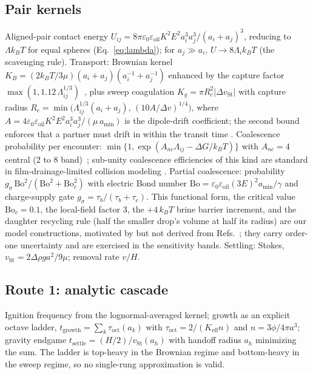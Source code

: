 \documentclass[aps,prfluids,reprint,amsmath,amssymb,superscriptaddress,longbibliography]{revtex4-2}
\begin{document}
\subsection{Pair kernels}
Aligned-pair contact energy
$U_{ij}=8\pi\varepsilon_0\varepsilon_{\mathrm{oil}}K^2E^2a_i^3a_j^3/(a_i+a_j)^3$,
reducing to $\Lambda k_BT$ for equal spheres (Eq.~\ref{eq:lambda}); for
$a_j\!\gg\!a_i$, $U\!\to\!8\Lambda_i k_BT$ (the scavenging rule). Transport:
Brownian kernel $K_B=(2k_BT/3\mu)(a_i+a_j)(a_i^{-1}+a_j^{-1})$ enhanced by
the capture factor $\max(1,1.12\,\Lambda_{ij}^{1/3})$~\cite{fuchs1934}, plus
sweep coagulation $K_g=\pi R_c^2|\Delta v_{\mathrm{St}}|$ with capture
radius $R_c=\min\!\big(\Lambda_{ij}^{1/3}(a_i{+}a_j),\,(10A/\Delta
v)^{1/4}\big)$, where $A=4\varepsilon_0\varepsilon_{\mathrm{oil}}K^2E^2
a_i^3a_j^3/(\mu\,a_{\min})$ is the dipole-drift coefficient; the second
bound enforces that a partner must drift in within the transit time
\cite{pruppacher1997}. Coalescence probability per encounter:
$\min\{1,\exp(A_{nc}\Lambda_{ij}-\Delta G/k_BT)\}$ with $A_{nc}=4$ central
(2 to 8 band)~\cite{davis1964}; sub-unity coalescence efficiencies of this
kind are standard in film-drainage-limited collision modeling
\cite{chesters1991,ivanov1999,braziersmith1972,charlesmason1960}. Partial coalescence: probability
$g_\sigma\,\mathrm{Bo}^2/(\mathrm{Bo}^2+\mathrm{Bo}_c^2)$ with electric Bond
number $\mathrm{Bo}=\varepsilon_0\varepsilon_{\mathrm{oil}}(3E)^2
a_{\min}/\gamma$ and charge-supply gate
$g_\sigma=\tau_b/(\tau_b+\tau_e)$. This functional form, the critical
value $\mathrm{Bo}_c=0.1$, the local-field factor 3, the $+4\,k_BT$ brine
barrier increment, and the daughter recycling rule (half the smaller
drop's volume at half its radius) are our model constructions, motivated by
but not derived from Refs.~\cite{bird2009,ristenpart2009,
mousavichoubeh2011,opawale1998}; they carry order-one uncertainty and are
exercised in the sensitivity bands. Settling:
Stokes, $v_{\mathrm{St}}=2\Delta\rho g a^2/9\mu$; removal rate $v/H$.

\subsection{Route 1: analytic cascade}
Ignition frequency from the lognormal-averaged kernel; growth as an explicit
octave ladder, $t_{\mathrm{growth}}=\sum_k\tau_{\mathrm{oct}}(a_k)$ with
$\tau_{\mathrm{oct}}=2/(K_{\mathrm{eff}}n)$ and $n=3\phi/4\pi a^3$;
gravity endgame $t_{\mathrm{settle}}=(H/2)/v_{\mathrm{St}}(a_h)$ with
handoff radius $a_h$ minimizing the sum. The ladder is top-heavy in the
Brownian regime and bottom-heavy in the sweep regime, so no single-rung
approximation is valid.
\end{document}
